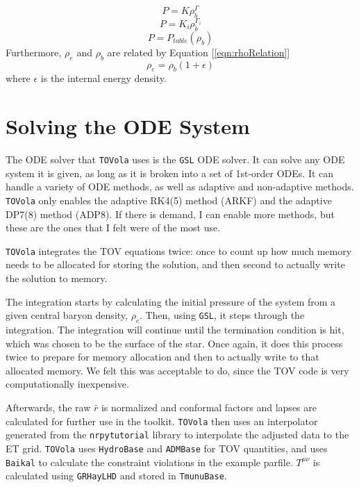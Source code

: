 \begin{equation}\label{eqn:EOS:S}
P=K\rho_b^{\Gamma}
\end{equation}
\begin{equation}\label{eqn:EOS:P}
P=K_i\rho_b^{\Gamma_i}
\end{equation}
\begin{equation}\label{eqn:EOS:T}
P=P_{table}(\rho_b)
\end{equation}
Furthermore, $\rho_e$ and $\rho_b$ are related by Equation [\ref{eqn:rhoRelation}]
\begin{equation}\label{eqn:rhoRelation}
\rho_e = \rho_b(1+\epsilon)
\end{equation}
where $\epsilon$ is the internal energy density.

\section{Solving the ODE System}

The ODE solver that {\tt TOVola} uses is the {\tt GSL} ODE solver. It can solve any ODE system it is given, as long as it is broken into a set of 1st-order ODEs. It can handle a variety of ODE methods, as well as adaptive and non-adaptive methods. {\tt TOVola} only enables the adaptive RK4(5) method (ARKF) and the adaptive DP7(8) method (ADP8). If there is demand, I can enable more methods, but these are the ones that I felt were of the most use.

{\tt TOVola} integrates the TOV equations twice: once to count up how much memory needs to be allocated for storing the solution, and then second to actually write the solution to memory. 

The integration starts by calculating the initial pressure of the system from a given central baryon density, $\rho_c$. Then, using {\tt GSL}, it steps through the integration. The integration will continue until the termination condition is hit, which was chosen to be the surface of the star. Once again, it does this process twice to prepare for memory allocation and then to actually write to that allocated memory. We felt this was acceptable to do, since the TOV code is very computationally inexpensive.

Afterwards, the raw $\bar{r}$ is normalized and conformal factors and lapses are calculated for further use in the toolkit. {\tt TOVola} then uses an interpolator generated from the {\tt nrpytutorial}\cite{NRpy} library to interpolate the adjusted data to the ET grid. {\tt TOVola} uses {\tt HydroBase} and {\tt ADMBase} for TOV quantities, and uses {\tt Baikal} to calculate the constraint violations in the example parfile. $T^{\mu\nu}$ is calculated using {\tt GRHayLHD} and stored in {\tt TmunuBase}.

